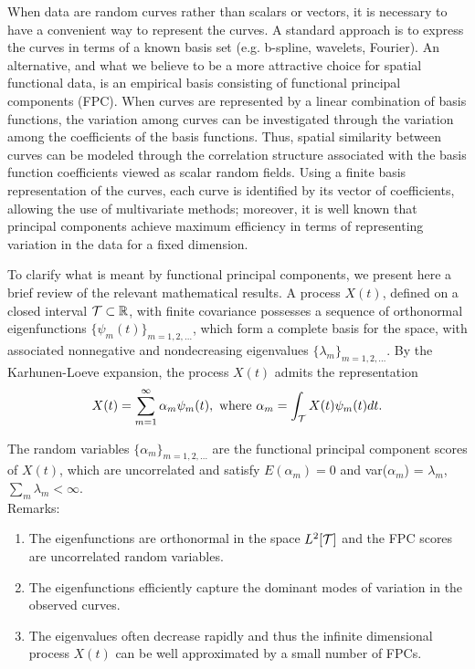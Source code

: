 
When data are random curves rather than scalars or vectors, it is necessary to have a convenient way to represent the curves.  A standard approach is to express the curves in terms of a known basis set (e.g. b-spline, wavelets, Fourier). An alternative, and what we believe to be a more attractive choice for spatial functional data, is an empirical basis consisting of functional principal components (FPC). When curves are represented by a linear combination of basis functions, the variation among curves can be investigated through the variation among the coefficients of the basis functions. Thus, spatial similarity between curves can be modeled through the correlation structure associated with the basis function coefficients viewed as scalar random fields. Using a finite basis representation of the curves, each curve is identified by its vector of coefficients, allowing the use of multivariate methods; moreover, it is well known that principal components achieve maximum efficiency in terms of representing variation in the data for a fixed dimension. 

To clarify what is meant by functional principal components, we present here a brief review of the relevant mathematical results.
A process $X(t)$, defined on a closed interval $\mathcal{T}  \subset  \mathbb{R} $,  with finite covariance possesses a sequence of orthonormal eigenfunctions $\{\psi_m(t)\}_{m=1,2,\ldots}$, which form a complete basis for the space, with associated nonnegative and nondecreasing eigenvalues $\{\lambda_m \}_{m=1,2,\ldots}$. By the Karhunen-Loeve expansion, the process $X(t)$ admits the representation
\begin{equation*}
X(t) =  \sum_{m=1}^{\infty}\alpha_m \psi_m(t), \mbox{ where  } \alpha_m = \int_{\mathcal{T}} X(t) \psi_m(t)dt.
\end{equation*}

The random variables $\{\alpha_m \}_{m=1,2,\ldots}$ are the functional principal component scores of $X(t)$, which are uncorrelated and satisfy $E(\alpha_m)=0$ and var($\alpha_m$) = $\lambda_m$, $\sum_m \lambda_m < \infty$.\\
Remarks:
\begin{enumerate}
	\item The eigenfunctions are orthonormal in the space $L^2[\mathcal{T}]$ and the FPC scores are uncorrelated random variables.
	\item The eigenfunctions efficiently capture the dominant modes of variation in the observed curves.
	\item The eigenvalues often decrease rapidly and thus the infinite dimensional process $X(t)$ can be well approximated by a small number of FPCs.
\end{enumerate}

